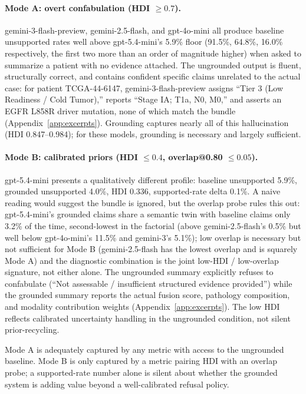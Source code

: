 \documentclass{article}
\theoremstyle{plain}
\begin{document}
\paragraph{Mode A: overt confabulation (HDI $\geq 0.7$).}
gemini-3-flash-preview, gemini-2.5-flash, and gpt-4o-mini all produce baseline unsupported rates well above gpt-5.4-mini's 5.9\% floor (91.5\%, 64.8\%, 16.0\% respectively, the first two more than an order of magnitude higher) when asked to summarize a patient with no evidence attached. The ungrounded output is fluent, structurally correct, and contains confident specific claims unrelated to the actual case: for patient TCGA-44-6147, gemini-3-flash-preview assigns ``Tier 3 (Low Readiness / Cold Tumor),'' reports ``Stage IA; T1a, N0, M0,'' and asserts an EGFR L858R driver mutation, none of which match the bundle (Appendix~\ref{app:excerpts}). Grounding captures nearly all of this hallucination (HDI 0.847--0.984); for these models, grounding is necessary and largely sufficient.

\paragraph{Mode B: calibrated priors (HDI $\leq 0.4$, overlap@0.80 $\leq 0.05$).}
gpt-5.4-mini presents a qualitatively different profile: baseline unsupported 5.9\%, grounded unsupported 4.0\%, HDI 0.336, supported-rate delta 0.1\%. A naive reading would suggest the bundle is ignored, but the overlap probe rules this out: gpt-5.4-mini's grounded claims share a semantic twin with baseline claims only 3.2\% of the time, second-lowest in the factorial (above gemini-2.5-flash's 0.5\% but well below gpt-4o-mini's 11.5\% and gemini-3's 5.1\%); low overlap is necessary but not sufficient for Mode B (gemini-2.5-flash has the lowest overlap and is squarely Mode A) and the diagnostic combination is the joint low-HDI / low-overlap signature, not either alone. The ungrounded summary explicitly refuses to confabulate (``Not assessable / insufficient structured evidence provided'') while the grounded summary reports the actual fusion score, pathology composition, and modality contribution weights (Appendix~\ref{app:excerpts}). The low HDI reflects calibrated uncertainty handling in the ungrounded condition, not silent prior-recycling.

Mode A is adequately captured by any metric with access to the ungrounded baseline. Mode B is only captured by a metric pairing HDI with an overlap probe; a supported-rate number alone is silent about whether the grounded system is adding value beyond a well-calibrated refusal policy.
\end{document}
